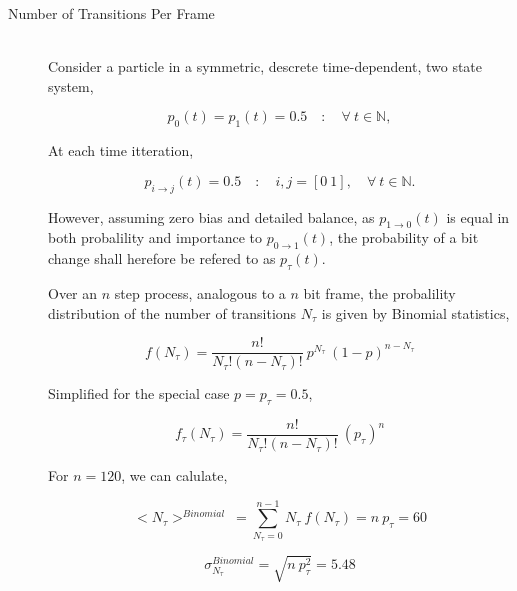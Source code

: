 			\begin{description}
				\item[Number of Transitions Per Frame] \hfill \\
					
					Consider a particle in a symmetric, descrete time-dependent, two state system,

					\begin{equation}
						p_0(t) = p_1(t) = 0.5 \quad : \quad \forall\ t \in \mathbb{N},
					\end{equation}

					At each time itteration,

					\begin{equation}
						p_{i \to j}(t) = 0.5 \quad : \quad i,j = [0\ 1], \quad \forall\ t \in \mathbb{N}.
					\end{equation}

					However, assuming zero bias and detailed balance, as $p_{1 \to 0}(t)$ is equal in both probalility and importance to $p_{0 \to 1}(t)$, the probability of a bit change shall herefore be refered to as $p_{\tau}(t)$.
					\par
					Over an $n$ step process, analogous to a $n$ bit frame, the probalility distribution of the number of transitions $N_\tau$ is given by Binomial statistics,

					\begin{equation}
						f(N_{\tau}) = \frac{n!}{N_{\tau}!(n-N_{\tau})!}\ p^{N_{\tau}}\ (1 - p)^{n-N_{\tau}}
					\end{equation}

					Simplified for the special case $p = p_{\tau} = 0.5$,

					\begin{equation}
						f_{\tau}(N_{\tau}) = \frac{n!}{N_{\tau}!(n-N_{\tau})!}\ (p_{\tau})^{n}
						\label{eqn:transition_propability_dencity}
					\end{equation}

					For $n = 120$, we can calulate,

					\begin{equation}
						<N_\tau>^{Binomial} \ = \sum_{N_{\tau}=0}^{n-1} N_{\tau}\ f(N_{\tau}) = n\ p_{\tau} = 60
						\label{eqn:tansition_expectation}
					\end{equation}

					\begin{equation}
						\sigma_{N_\tau}^{Binomial} = \sqrt{ n\ p_{\tau}^2} = 5.48
					\end{equation}


\end{description}
